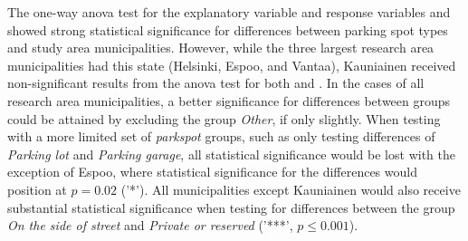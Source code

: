 The one-way \acrshort{anova} test for the explanatory variable  and response variables  and  showed strong statistical significance for differences between parking spot types and study area municipalities. However, while the three largest research area municipalities had this state (Helsinki, Espoo, and Vantaa), Kauniainen received non-significant results from the \acrshort{anova} test for both  and . In the cases of all research area municipalities, a better significance for differences between  groups could be attained by excluding the group \textit{Other}, if only slightly. When testing with a more limited set of \textit{parkspot} groups, such as only testing differences of \textit{Parking lot} and \textit{Parking garage}, all statistical significance would be lost with the exception of Espoo, where statistical significance for the differences would position at $p = 0.02$ ('*'). All municipalities except Kauniainen would also receive substantial statistical significance when testing for differences between the group \textit{On the side of street} and \textit{Private or reserved} ('***', $p \leq 0.001$).

